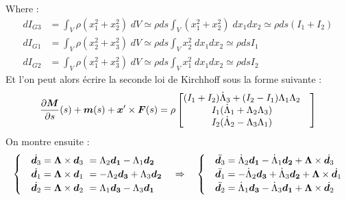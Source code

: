 Where :
\begin{subequations}
	\begin{align}
		dI_{G3} &= \int_V \rho (x_1^2+ x_2^2)\;dV
		\simeq \rho ds \int_V (x_1^2+x_2^2)\;dx_1dx_2
		\simeq \rho ds (I_1 + I_2)
		\\
		dI_{G1} &= \int_V \rho (x_2^2+ x_3^2)\;dV
		\simeq \rho ds \int_V x_2^2\;dx_1dx_2
		\simeq \rho ds I_1
		\\
		dI_{G2} &= \int_V \rho (x_1^2+ x_3^2)\;dV
		\simeq \rho ds \int_V x_1^2\;dx_1dx_2
		\simeq \rho ds I_2
	\end{align}
\end{subequations}
Et l'on peut alors écrire la seconde loi de Kirchhoff sous la forme suivante :
\begin{equation}
	\begin{aligned}
		\frac{\partial \boldsymbol{M}}{\partial s}(s)+\boldsymbol{m}(s) + \boldsymbol{x}'\times \boldsymbol{F}(s)
		= \rho
			\begin{bmatrix}
				(I_1 + I_2)\dot{\Lambda}_3 + (I_2 - I_1)\Lambda_1\Lambda_2&\\
				I_1 (\dot{\Lambda}_1 + \Lambda_2 \Lambda_3) &\\
				I_2 (\dot{\Lambda}_2 - \Lambda_3 \Lambda_1) &
			\end{bmatrix}
	\end{aligned}
\end{equation}
On montre ensuite :
\begin{equation}
\begin{cases}
&\dot{\boldsymbol{d}_3} 	= \boldsymbol{\Lambda}\times \boldsymbol{d}_3\
				= \Lambda_2\boldsymbol{d_1} - \Lambda_1\boldsymbol{d_2}\\
&\dot{\boldsymbol{d}_1} 	= \boldsymbol{\Lambda}\times \boldsymbol{d}_1\
				= -\Lambda_2\boldsymbol{d_3} + \Lambda_3\boldsymbol{d_2}\\
&\dot{\boldsymbol{d}_2} 	= \boldsymbol{\Lambda}\times \boldsymbol{d}_2\
				= \Lambda_1\boldsymbol{d_3} - \Lambda_3\boldsymbol{d_1}\\
\end{cases}
\quad\Rightarrow\quad
\begin{cases}
&\ddot{\boldsymbol{d}_3} 	= \dot{\Lambda}_2\boldsymbol{d_1} - \dot{\Lambda}_1\boldsymbol{d_2}
				+ \boldsymbol{\Lambda} \times \dot{\boldsymbol{d}_3}\\
&\ddot{\boldsymbol{d}_1} 	= -\dot{\Lambda}_2\boldsymbol{d_3} + \dot{\Lambda}_3\boldsymbol{d_2}
				+ \boldsymbol{\Lambda} \times \dot{\boldsymbol{d}_1}\\
&\ddot{\boldsymbol{d}_2} 	= \dot{\Lambda}_1\boldsymbol{d_3} - \dot{\Lambda}_3\boldsymbol{d_1}
				+ \boldsymbol{\Lambda} \times \dot{\boldsymbol{d}_2}
\end{cases}
\end{equation}
